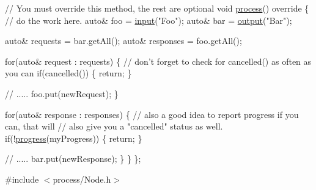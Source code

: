 \begin{DoxyCode}
    \textcolor{comment}{// You must override this method, the rest are optional}
    \textcolor{keywordtype}{void} \hyperlink{classdg_1_1deepcore_1_1_node_aef240255b12a25d235fffa1c206e4925}{process}()\textcolor{keyword}{ override}
\textcolor{keyword}{    }\{
        \textcolor{comment}{// do the work here.}
        \textcolor{keyword}{auto}& foo = \hyperlink{classdg_1_1deepcore_1_1_node_ab989e614ca802698356be8a5d46faa49}{input}(\textcolor{stringliteral}{"Foo"});
        \textcolor{keyword}{auto}& bar = \hyperlink{classdg_1_1deepcore_1_1_node_a2f88c5f894f2151877525cf305129a8f}{output}(\textcolor{stringliteral}{"Bar"});

        \textcolor{keyword}{auto}& requests = bar.getAll();
        \textcolor{keyword}{auto}& responses = foo.getAll();

        \textcolor{keywordflow}{for}(\textcolor{keyword}{auto}& request : requests) \{
            \textcolor{comment}{// don't forget to check for cancelled() as often as you can}
            \textcolor{keywordflow}{if}(cancelled()) \{ \textcolor{keywordflow}{return}; \}

            \textcolor{comment}{// .....}
            foo.put(newRequest);
        \}

        \textcolor{keywordflow}{for}(\textcolor{keyword}{auto}& response : responses) \{
            \textcolor{comment}{// also a good idea to report progress if you can, that will}
            \textcolor{comment}{// also give you a "cancelled" status as well.}
            \textcolor{keywordflow}{if}(!\hyperlink{classdg_1_1deepcore_1_1_node_a500a8cb8d1f8f8438025fe196aea04ab}{progress}(myProgress)) \{ \textcolor{keywordflow}{return}; \}

            \textcolor{comment}{// .....}
            bar.put(newResponse);
        \}
    \}
\};
\end{DoxyCode}
 

{\ttfamily \#include $<$process/\+Node.\+h$>$}



